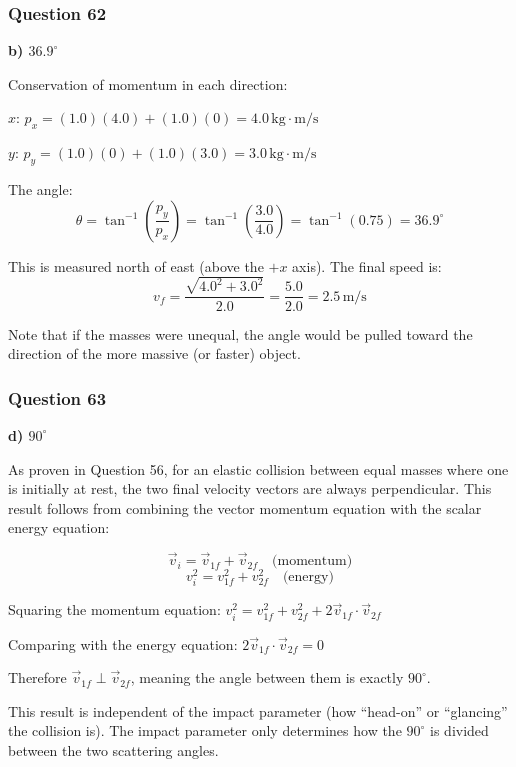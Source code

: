 \documentclass[12pt,letterpaper]{article}
\begin{document}
\subsubsection*{Question 62}

\begin{answerbox}
\textbf{b) $36.9^\circ$}
\end{answerbox}

\begin{explanationbox}
Conservation of momentum in each direction:

$x$: $p_x = (1.0)(4.0) + (1.0)(0) = 4.0\,\text{kg}\cdot\text{m/s}$

$y$: $p_y = (1.0)(0) + (1.0)(3.0) = 3.0\,\text{kg}\cdot\text{m/s}$

The angle:
\[
\theta = \tan^{-1}\left(\frac{p_y}{p_x}\right) = \tan^{-1}\left(\frac{3.0}{4.0}\right) = \tan^{-1}(0.75) = 36.9^\circ
\]

This is measured north of east (above the $+x$ axis). The final speed is:
\[
v_f = \frac{\sqrt{4.0^2 + 3.0^2}}{2.0} = \frac{5.0}{2.0} = 2.5\,\text{m/s}
\]

Note that if the masses were unequal, the angle would be pulled toward the direction of the more massive (or faster) object.
\end{explanationbox}

\subsubsection*{Question 63}

\begin{answerbox}
\textbf{d) $90^\circ$}
\end{answerbox}

\begin{explanationbox}
As proven in Question 56, for an elastic collision between equal masses where one is initially at rest, the two final velocity vectors are always perpendicular. This result follows from combining the vector momentum equation with the scalar energy equation:

\[
\vec{v}_i = \vec{v}_{1f} + \vec{v}_{2f} \quad \text{(momentum)}
\]
\[
v_i^2 = v_{1f}^2 + v_{2f}^2 \quad \text{(energy)}
\]

Squaring the momentum equation: $v_i^2 = v_{1f}^2 + v_{2f}^2 + 2\vec{v}_{1f}\cdot\vec{v}_{2f}$

Comparing with the energy equation: $2\vec{v}_{1f}\cdot\vec{v}_{2f} = 0$

Therefore $\vec{v}_{1f} \perp \vec{v}_{2f}$, meaning the angle between them is exactly $90^\circ$.

This result is independent of the impact parameter (how ``head-on'' or ``glancing'' the collision is). The impact parameter only determines how the $90^\circ$ is divided between the two scattering angles.
\end{explanationbox}
\end{document}
